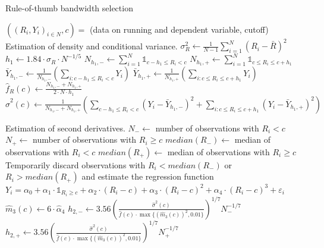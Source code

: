 \documentclass[11pt, a4paper, leqno]{article}
\numberwithin{equation}{section}
\numberwithin{figure}{section}
\numberwithin{table}{section}
\numberwithin{algorithm}{section}
\begin{document}
\begin{algorithm}
	\caption{Rule-of-thumb bandwidth selection}\label{alg:rot}
	\begin{algorithmic}[1]
		\Require $((R_{i}, Y_{i})_{i \in N}, c) =$ (data on running and dependent variable, cutoff)
		\Stepone Estimation of density and conditional variance.
		\State $\sigma^{2}_{R} \gets \frac{1}{N-1} \sum_{i=1}^{N} (R_{i} - \bar{R})^{2}$
		\State $h_{1} \gets 1.84 \cdot \sigma_{R} \cdot N^{-1/5}$
		\State $N_{h_{1}, -} \gets \sum_{i=1}^{N} \mathds{1}_{c-h_{1} \leq R_{i} < c}$
		\State $N_{h_{1}, +} \gets \sum_{i=1}^{N} \mathds{1}_{c \leq R_{i} \leq c+h_{1}}$
		\State $\bar{Y}_{h_{1}, -} \gets \frac{1}{N_{h_{1}, -}} \left(\sum_{i: c-h_{1} \leq R_{i} < c} Y_{i} \right)$
		\State $\bar{Y}_{h_{1}, +} \gets \frac{1}{N_{h_{1}, +}} \left(\sum_{i: c \leq R_{i} \leq c+h_{1}} Y_{i} \right)$
		\State $\widehat{f}_{R}(c) \gets \frac{N_{h_{1}, -} + N_{h_{1}, +}}{2 \cdot N \cdot h_{1}}$ {\color{blue} }
		\State $\widehat{\sigma}^{2}(c) \gets \frac{1}{N_{h_{1}, -} + N_{h_{1}, +}} \left( \sum_{c-h_{1} \leq R_{i} < c} \left( Y_{i} - \bar{Y}_{h_{1}, -}\right)^{2} + \sum_{i: c \leq R_{i} \leq c+h_{1}} \left( Y_{i} - \bar{Y}_{h_{1}, +} \right)^{2} \right)$

		\Steptwo Estimation of second derivatives.
		\State $N_{-} \gets$ number of observations with $R_{i} < c$
		\State $N_{+} \gets$ number of observations with $R_{i} \geq c$
		\State $median(R_{-}) \gets$ median of observations with $R_{i} < c$
		\State $median(R_{+}) \gets$ median of observations with $R_{i} \geq c$
		\State Temporarily discard observations with $R_{i} < median(R_{-})$ or $R_{i} > median(R_{+})$ and estimate the regression function \newline $Y_{i} = \alpha_{0} + \alpha_{1} \cdot \mathds{1}_{R_{i} \geq c} + \alpha_{2} \cdot (R_{i}-c) + \alpha_{3} \cdot (R_{i}-c)^{2} + \alpha_{4} \cdot (R_{i}-c)^{3} + \varepsilon_{i}$
		\State $\widehat{m}_{3}(c) \gets 6 \cdot \widehat{\alpha}_{4}$
		\State $h_{2, -} \gets 3.56 \left( \frac{\widehat{\sigma}^{2}(c)}{\widehat{f}(c) \cdot \max\lbrace \left(\widehat{m}_{3}(c)\right)^{2}, 0.01\rbrace}\right)^{1/7} N_{-}^{-1/7}$
		\State $h_{2, +} \gets 3.56 \left( \frac{\widehat{\sigma}^{2}(c)}{\widehat{f}(c) \cdot \max\lbrace \left(\widehat{m}_{3}(c)\right)^{2}, 0.01\rbrace}\right)^{1/7} N_{+}^{-1/7}$


\end{algorithmic}
\end{algorithm}
\end{document}
